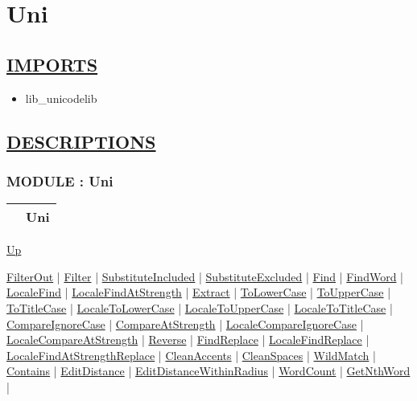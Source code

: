 \chapter*{Uni}
\hypertarget{ecldoc:toc:Uni}{}

\section*{\underline{IMPORTS}}
\begin{itemize}
\item lib\_unicodelib
\end{itemize}

\section*{\underline{DESCRIPTIONS}}
\subsection*{MODULE : Uni}
\hypertarget{ecldoc:Uni}{}

{\renewcommand{\arraystretch}{1.5}
\begin{tabularx}{\textwidth}{|>{\raggedright\arraybackslash}l|X|}
\hline
\hspace{0pt} & Uni \\
\hline
\end{tabularx}
}

\hyperlink{ecldoc:toc:root}{Up}

\par


\hyperlink{ecldoc:uni.filterout}{FilterOut}  |
\hyperlink{ecldoc:uni.filter}{Filter}  |
\hyperlink{ecldoc:uni.substituteincluded}{SubstituteIncluded}  |
\hyperlink{ecldoc:uni.substituteexcluded}{SubstituteExcluded}  |
\hyperlink{ecldoc:uni.find}{Find}  |
\hyperlink{ecldoc:uni.findword}{FindWord}  |
\hyperlink{ecldoc:uni.localefind}{LocaleFind}  |
\hyperlink{ecldoc:uni.localefindatstrength}{LocaleFindAtStrength}  |
\hyperlink{ecldoc:uni.extract}{Extract}  |
\hyperlink{ecldoc:uni.tolowercase}{ToLowerCase}  |
\hyperlink{ecldoc:uni.touppercase}{ToUpperCase}  |
\hyperlink{ecldoc:uni.totitlecase}{ToTitleCase}  |
\hyperlink{ecldoc:uni.localetolowercase}{LocaleToLowerCase}  |
\hyperlink{ecldoc:uni.localetouppercase}{LocaleToUpperCase}  |
\hyperlink{ecldoc:uni.localetotitlecase}{LocaleToTitleCase}  |
\hyperlink{ecldoc:uni.compareignorecase}{CompareIgnoreCase}  |
\hyperlink{ecldoc:uni.compareatstrength}{CompareAtStrength}  |
\hyperlink{ecldoc:uni.localecompareignorecase}{LocaleCompareIgnoreCase}  |
\hyperlink{ecldoc:uni.localecompareatstrength}{LocaleCompareAtStrength}  |
\hyperlink{ecldoc:uni.reverse}{Reverse}  |
\hyperlink{ecldoc:uni.findreplace}{FindReplace}  |
\hyperlink{ecldoc:uni.localefindreplace}{LocaleFindReplace}  |
\hyperlink{ecldoc:uni.localefindatstrengthreplace}{LocaleFindAtStrengthReplace}  |
\hyperlink{ecldoc:uni.cleanaccents}{CleanAccents}  |
\hyperlink{ecldoc:uni.cleanspaces}{CleanSpaces}  |
\hyperlink{ecldoc:uni.wildmatch}{WildMatch}  |
\hyperlink{ecldoc:uni.contains}{Contains}  |
\hyperlink{ecldoc:uni.editdistance}{EditDistance}  |
\hyperlink{ecldoc:uni.editdistancewithinradius}{EditDistanceWithinRadius}  |
\hyperlink{ecldoc:uni.wordcount}{WordCount}  |
\hyperlink{ecldoc:uni.getnthword}{GetNthWord}  |

